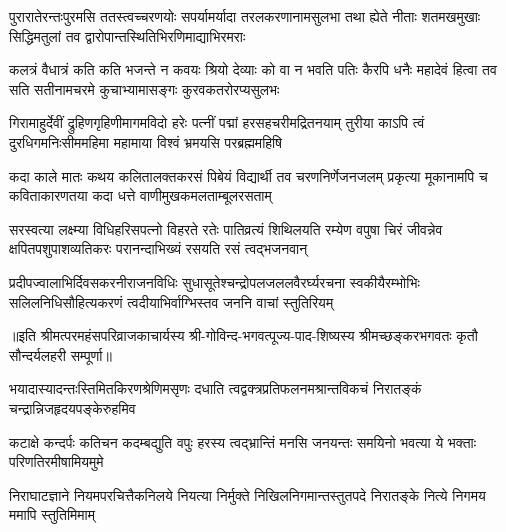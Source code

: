 \fourlineindentedshloka
{पुरारातेरन्तःपुरमसि ततस्त्वच्चरणयोः}
{सपर्यामर्यादा तरलकरणानामसुलभा}
{तथा ह्येते नीताः शतमखमुखाः सिद्धिमतुलां}
{तव द्वारोपान्तस्थितिभिरणिमाद्याभिरमराः}%

\fourlineindentedshloka
{कलत्रं वैधात्रं कति कति भजन्ते न कवयः}
{श्रियो देव्याः को वा न भवति पतिः कैरपि धनैः}
{महादेवं हित्वा तव सति सतीनामचरमे}
{कुचाभ्यामासङ्गः कुरवकतरोरप्यसुलभः}%

\fourlineindentedshloka
{गिरामाहुर्देवीं द्रुहिणगृहिणीमागमविदो}
{हरेः पत्नीं पद्मां हरसहचरीमद्रितनयाम्}
{तुरीया काऽपि त्वं दुरधिगमनिःसीममहिमा}
{महामाया विश्वं भ्रमयसि परब्रह्ममहिषि}%

\fourlineindentedshloka
{कदा काले मातः कथय कलितालक्तकरसं}
{पिबेयं विद्यार्थी तव चरणनिर्णेजनजलम्}
{प्रकृत्या मूकानामपि च कविताकारणतया}
{कदा धत्ते वाणीमुखकमलताम्बूलरसताम्}%

\fourlineindentedshloka
{सरस्वत्या लक्ष्म्या विधिहरिसपत्नो विहरते}
{रतेः पातिव्रत्यं शिथिलयति रम्येण वपुषा}
{चिरं जीवन्नेव क्षपितपशुपाशव्यतिकरः}
{परानन्दाभिख्यं रसयति रसं त्वद्भजनवान्}%

\fourlineindentedshloka
{प्रदीपज्वालाभिर्दिवसकरनीराजनविधिः}
{सुधासूतेश्चन्द्रोपलजललवैरर्घ्यरचना}
{स्वकीयैरम्भोभिः सलिलनिधिसौहित्यकरणं}
{त्वदीयाभिर्वाग्भिस्तव जननि वाचां स्तुतिरियम्}%

॥इति श्रीमत्परमहंसपरिव्राजकाचार्यस्य श्री-गोविन्द-भगवत्पूज्य-पाद-शिष्यस्य
श्रीमच्छङ्करभगवतः कृतौ सौन्दर्यलहरी सम्पूर्णा॥


\closesection

{भयादास्यादन्तःस्तिमितकिरणश्रेणिमसृणः}
{दधाति त्वद्वक्त्रप्रतिफलनमश्रान्तविकचं}
{निरातङ्कं चन्द्रान्निजहृदयपङ्केरुहमिव}%

{कटाक्षे कन्दर्पः कतिचन कदम्बद्युति वपुः}
{हरस्य त्वद्भ्रान्तिं मनसि जनयन्तः समयिनो}
{भवत्या ये भक्ताः परिणतिरमीषामियमुमे}%

{निराघाटज्ञाने नियमपरचित्तैकनिलये}
{नियत्या निर्मुक्ते निखिलनिगमान्तस्तुतपदे}
{निरातङ्के नित्ये निगमय ममापि स्तुतिमिमाम्}%
